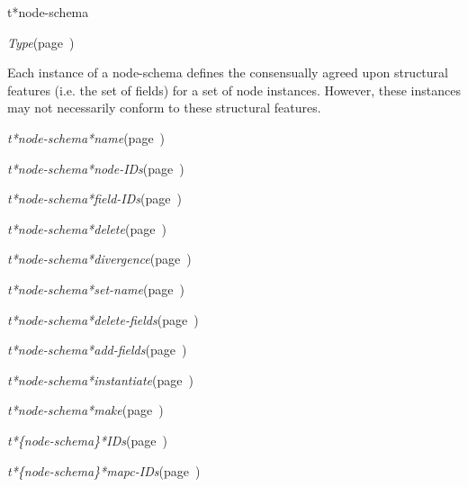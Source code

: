 \begin{description}
\item [Name:]  t*node-schema

\item [Layer:] {\sl Type}\hfill(page~\pageref{Type})

\item [Description:]

Each instance of a node-schema defines the consensually 
agreed upon structural features (i.e. the set of fields)
for a set of node instances.  However, these instances
may not necessarily conform to these structural 
features. 

\item [Attributes:]
\item {\sl t*node-schema*name}\hfill(page~\pageref{t*node-schema*name})
\item {\sl t*node-schema*node-IDs}\hfill(page~\pageref{t*node-schema*node-IDs})
\item {\sl t*node-schema*field-IDs}\hfill(page~\pageref{t*node-schema*field-IDs})

\item [Operations:]
\item {\sl t*node-schema*delete}\hfill(page~\pageref{t*node-schema*delete})
\item {\sl t*node-schema*divergence}\hfill(page~\pageref{t*node-schema*divergence})
\item {\sl t*node-schema*set-name}\hfill(page~\pageref{t*node-schema*set-name})
\item {\sl t*node-schema*delete-fields}\hfill(page~\pageref{t*node-schema*delete-fields})
\item {\sl t*node-schema*add-fields}\hfill(page~\pageref{t*node-schema*add-fields})
\item {\sl t*node-schema*instantiate}\hfill(page~\pageref{t*node-schema*instantiate})
\item {\sl t*node-schema*make}\hfill(page~\pageref{t*node-schema*make})

\item {\sl t*\{node-schema\}*IDs}\hfill(page~\pageref{t*node-schema*IDs})
\item {\sl t*\{node-schema\}*mapc-IDs}\hfill(page~\pageref{t*node-schema*mapc-IDs})

\item [Subclasses:]


\item [Superclasses:]


\item [Instances:]




\end{description}
\horizontalline

